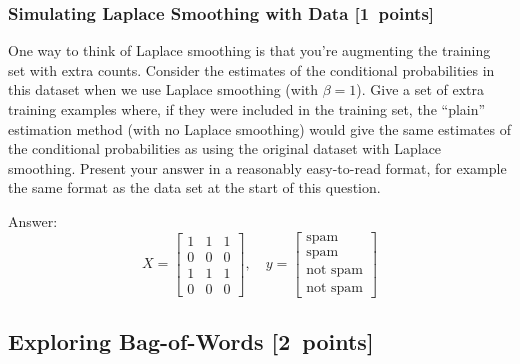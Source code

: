 \documentclass{article}
\newcommand{\blu}[1]{{\textcolor{blu}{#1}}}
\newenvironment{answer}{\par\begingroup\color{gre}Answer: }{\endgroup}
\let\ask\blu
\newcommand\pts[1]{\textcolor{pointscolour}{[#1~points]}}
\begin{document}
    \subsubsection{Simulating Laplace Smoothing with Data \pts{1}}
    \label{laplace.conceptual}

    One way to think of Laplace smoothing is that you're augmenting the training set with extra counts. Consider the estimates of the conditional probabilities in this dataset when we use Laplace smoothing (with $\beta = 1$).
    \ask{Give a set of extra training examples where, if they were included in the training set, the ``plain'' estimation method (with no Laplace smoothing) would give the same estimates of the conditional probabilities as using the original dataset with Laplace smoothing.}
        Present your answer in a reasonably easy-to-read format, for example the same format as the data set at the start of this question.

    \begin{answer}
        \[
            X = \begin{bmatrix}
                1 & 1 & 1\\
                0 & 0 & 0\\
                1 & 1 & 1\\
                0 & 0 & 0
            \end{bmatrix},
            \quad y = \begin{bmatrix}
                \text{spam}\\
                \text{spam}\\
                \text{not spam}\\
                \text{not spam}
            \end{bmatrix}
        \]
    \end{answer}

    \clearpage
    \subsection{Exploring Bag-of-Words \pts{2}}
\end{document}
